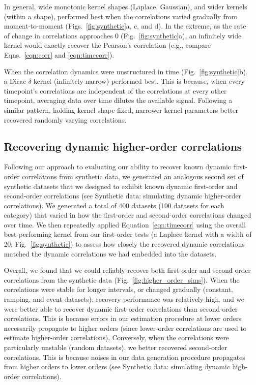 \documentclass[english]{article}
\begin{document}
In general, wide monotonic kernel shapes (Laplace, Gaussian), and
wider kernels (within a shape), performed best when the correlations
varied gradually from moment-to-moment (Figs.~\ref{fig:synthetic}a, c,
and d).  In the extreme, as the rate of change in correlations
approaches 0 (Fig.~\ref{fig:synthetic}a), an infinitely wide kernel
would exactly recover the Pearson's correlation (e.g., compare
Eqns.~\ref{eqn:corr} and \ref{eqn:timecorr}).

When the correlation dynamics were unstructured in time
(Fig.~\ref{fig:synthetic}b), a Dirac $\delta$ kernel (infinitely
narrow) performed best.  This is because, when every timepoint's
correlations are independent of the correlations at every other
timepoint, averaging data over time dilutes the available signal.
Following a similar pattern, holding kernel shape fixed, narrower
kernel parameters better recovered randomly varying correlations.

\subsection*{Recovering dynamic higher-order correlations}
Following our approach to evaluating our ability to recover known
dynamic first-order correlations from synthetic data, we generated an
analogous second set of synthetic datasets that we designed to exhibit
known dynamic first-order and second-order correlations (see
Synthetic data: simulating dynamic higher-order
  correlations).  We generated a total of 400 datasets (100 datasets
for each category) that varied in
how the first-order and second-order correlations changed over time.
We then repeatedly applied Equation~\ref{eqn:timecorr} using the
overall best-performing kernel from our first-order tests (a Laplace
kernel with a width of 20; Fig.~\ref{fig:synthetic}) to assess how
closely the recovered dynamic correlations matched the dynamic
correlations we had embedded into the datasets.

Overall, we found that we could reliably recover both first-order and
second-order correlations from the synthetic data
(Fig.~\ref{fig:higher_order_sims}).  When the correlations were stable
for longer intervals, or changed gradually (constant, ramping, and
event datasets), recovery performance was relatively high, and we were
better able to recover dynamic first-order correlations than
second-order correlations.  This is because errors in our estimation
procedure at lower orders necessarily propagate to higher orders
(since lower-order correlations are used to estimate higher-order
correlations).  Conversely, when the correlations were particularly
unstable (random datasets), we better recovered second-order
correlations.  This is because noises in our data generation
procedure propagates from higher orders to lower orders (see
Synthetic data: simulating dynamic high-order correlations).
\end{document}
